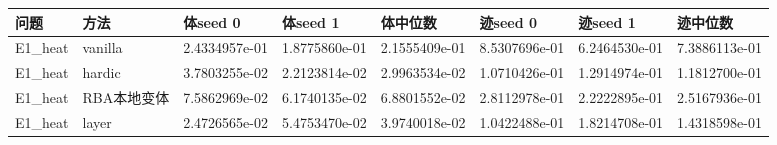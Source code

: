 \documentclass[11pt,a4paper]{article}
\newcounter{none}
\begin{document}
{\def\LTcaptype{none} %
\begin{longtable}[]{@{}
  >{\raggedright\arraybackslash}p{}
  >{\raggedright\arraybackslash}p{}
  >{\raggedleft\arraybackslash}p{}
  >{\raggedleft\arraybackslash}p{}
  >{\raggedleft\arraybackslash}p{}
  >{\raggedleft\arraybackslash}p{}
  >{\raggedleft\arraybackslash}p{}
  >{\raggedleft\arraybackslash}p{}@{}}
\toprule\noalign{}
\begin{minipage}[b]{\linewidth}\raggedright
问题
\end{minipage} & \begin{minipage}[b]{\linewidth}\raggedright
方法
\end{minipage} & \begin{minipage}[b]{\linewidth}\raggedleft
体seed 0
\end{minipage} & \begin{minipage}[b]{\linewidth}\raggedleft
体seed 1
\end{minipage} & \begin{minipage}[b]{\linewidth}\raggedleft
体中位数
\end{minipage} & \begin{minipage}[b]{\linewidth}\raggedleft
迹seed 0
\end{minipage} & \begin{minipage}[b]{\linewidth}\raggedleft
迹seed 1
\end{minipage} & \begin{minipage}[b]{\linewidth}\raggedleft
迹中位数
\end{minipage} \\
\midrule\noalign{}
\endhead
\bottomrule\noalign{}
\endlastfoot
E1\_\allowbreak{}heat & vanilla & 2.4334957e-01 & 1.8775860e-01 & 2.1555409e-01 & 8.5307696e-01 & 6.2464530e-01 & 7.3886113e-01 \\
E1\_\allowbreak{}heat & hardic & 3.7803255e-02 & 2.2123814e-02 & 2.9963534e-02 & 1.0710426e-01 & 1.2914974e-01 & 1.1812700e-01 \\
E1\_\allowbreak{}heat & RBA本地变体 & 7.5862969e-02 & 6.1740135e-02 & 6.8801552e-02 & 2.8112978e-01 & 2.2222895e-01 & 2.5167936e-01 \\
E1\_\allowbreak{}heat & layer & 2.4726565e-02 & 5.4753470e-02 & 3.9740018e-02 & 1.0422488e-01 & 1.8214708e-01 & 1.4318598e-01 \\

\end{longtable}}
\end{document}
